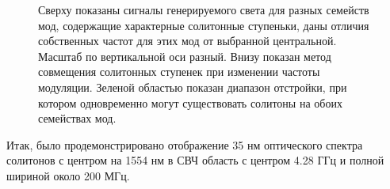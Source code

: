 \begin{figure}[ht]
\begin{minipage}[ht]{1\linewidth}
\end{minipage}
\caption{Сверху показаны сигналы генерируемого света для разных семейств мод, содержащие характерные солитонные ступеньки, даны отличия собственных частот для этих мод от выбранной центральной. Масштаб по вертикальной оси разный. Внизу показан метод совмещения солитонных ступенек при изменении частоты модуляции. Зеленой областью показан диапазон отстройки, при котором одновременно могут существовать солитоны на обоих семействах мод.}
\label{Figure2}
\end{figure}


Итак, было продемонстрировано отображение 35 нм оптического спектра солитонов с центром на 1554 нм в СВЧ область с центром 4.28 ГГц и полной шириной около 200 МГц.

